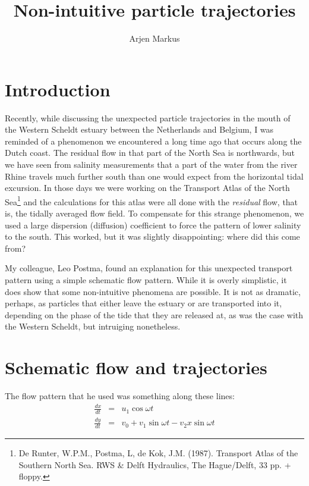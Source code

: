 \documentclass[onecolumn]{article}
\begin{document}
\title{Non-intuitive particle trajectories}
\author{Arjen Markus}

\maketitle

\section*{Introduction}
Recently, while discussing the unexpected particle trajectories in the mouth of the
Western Scheldt estuary between the Netherlands and Belgium, I was reminded of a phenomenon we
encountered a long time ago that occurs along the Dutch coast. The residual flow in that part of
the North Sea is northwards, but we have seen from salinity measurements that a part of the water
from the river Rhine travels much further south than one would expect from the horizontal tidal
excursion. In those days we were working on the Transport Atlas of the North Sea\footnote{
De Runter, W.P.M., Postma, L, de Kok, J.M. (1987). Transport Atlas of the Southern North Sea.
RWS \& Delft Hydraulics, The Hague/Delft, 33 pp. + floppy.}
and the calculations for this atlas were all done with the \emph{residual} flow, that is,
the tidally averaged flow field. To compensate for this strange phenomenon, we used a
large dispersion (diffusion) coefficient to force the pattern of lower salinity to the south.
This worked, but it was slightly disappointing: where did this come from?

My colleague, Leo Postma, found an explanation for this unexpected transport pattern using a simple schematic flow pattern.
While it is overly simplistic, it does show that some non-intuitive phenomena are possible. It
is not as dramatic, perhaps, as particles that either leave the estuary or are transported
into it, depending on the phase of the tide that they are released at, as was the case
with the Western Scheldt, but intruiging nonetheless.


\section*{Schematic flow and trajectories}
The flow pattern that he used was something along these lines:
\begin{eqnarray}
    \frac{dx}{dt} &=& u_1 \cos \omega t \\
    \frac{dy}{dt} &=& v_0 + v_1 \sin \omega t - v_2 x \sin \omega t
\end{eqnarray}
\end{document}
